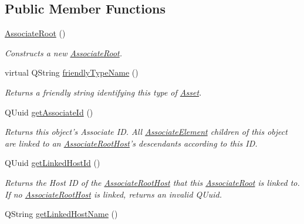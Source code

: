 \subsection*{Public Member Functions}
\begin{DoxyCompactItemize}
\item 
\hyperlink{class_picto_1_1_associate_root_af5e611a1c7476d54dadfd923ed89986f}{Associate\-Root} ()
\begin{DoxyCompactList}\small\item\em Constructs a new \hyperlink{class_picto_1_1_associate_root}{Associate\-Root}. \end{DoxyCompactList}\item 
virtual Q\-String \hyperlink{class_picto_1_1_associate_root_a2e5c6a730c95a1e2b877eec83f7b8759}{friendly\-Type\-Name} ()
\begin{DoxyCompactList}\small\item\em Returns a friendly string identifying this type of \hyperlink{class_picto_1_1_asset}{Asset}. \end{DoxyCompactList}\item 
\hypertarget{class_picto_1_1_associate_root_a0064d1b0331ebf9d8264e9e08a945646}{Q\-Uuid \hyperlink{class_picto_1_1_associate_root_a0064d1b0331ebf9d8264e9e08a945646}{get\-Associate\-Id} ()}\label{class_picto_1_1_associate_root_a0064d1b0331ebf9d8264e9e08a945646}

\begin{DoxyCompactList}\small\item\em Returns this object's Associate I\-D. All \hyperlink{class_picto_1_1_associate_element}{Associate\-Element} children of this object are linked to an \hyperlink{class_picto_1_1_associate_root_host}{Associate\-Root\-Host}'s descendants according to this I\-D. \end{DoxyCompactList}\item 
\hypertarget{class_picto_1_1_associate_root_a75434436456954826aee938c4a12f04e}{Q\-Uuid \hyperlink{class_picto_1_1_associate_root_a75434436456954826aee938c4a12f04e}{get\-Linked\-Host\-Id} ()}\label{class_picto_1_1_associate_root_a75434436456954826aee938c4a12f04e}

\begin{DoxyCompactList}\small\item\em Returns the Host I\-D of the \hyperlink{class_picto_1_1_associate_root_host}{Associate\-Root\-Host} that this \hyperlink{class_picto_1_1_associate_root}{Associate\-Root} is linked to. If no \hyperlink{class_picto_1_1_associate_root_host}{Associate\-Root\-Host} is linked, returns an invalid Q\-Uuid. \end{DoxyCompactList}\item 
\hypertarget{class_picto_1_1_associate_root_a4bbc35f5c153218b995fea7141731b0b}{Q\-String \hyperlink{class_picto_1_1_associate_root_a4bbc35f5c153218b995fea7141731b0b}{get\-Linked\-Host\-Name} ()}\label{class_picto_1_1_associate_root_a4bbc35f5c153218b995fea7141731b0b}


\end{DoxyCompactItemize}
